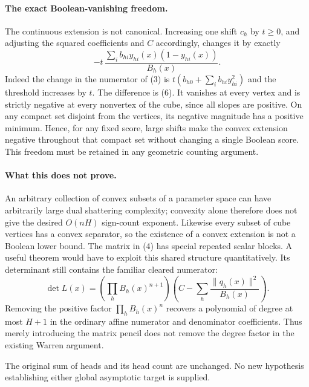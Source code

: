 \documentclass[11pt]{article}
\begin{document}
\paragraph{The exact Boolean-vanishing freedom.}
The continuous extension is not canonical. Increasing one shift $c_h$
by $t\geq0$, and adjusting the squared coefficients and $C$ accordingly,
changes it by exactly
\[
 -t\,\frac{\sum_i b_{hi}y_{hi}(x)(1-y_{hi}(x))}{B_h(x)}.
 \tag{6}
\]
Indeed the change in the numerator of (3) is
$t(b_{h0}+\sum_i b_{hi}y_{hi}^2)$ and the threshold increases by $t$.
The difference is (6). It vanishes at every vertex and is strictly
negative at every nonvertex of the cube, since all slopes are positive.
On any compact set disjoint from the vertices, its negative magnitude
has a positive minimum. Hence, for any fixed score, large shifts make
the convex extension negative throughout that compact set without
changing a single Boolean score. This freedom must be retained in any
geometric counting argument.

\paragraph{What this does not prove.}
An arbitrary collection of convex subsets of a parameter space can
have arbitrarily large dual shattering complexity; convexity alone
therefore does not give the desired $O(nH)$ sign-count exponent.
Likewise every subset of cube vertices has a convex separator, so the
existence of a convex extension is not a Boolean lower bound. The
matrix in (4) has special repeated scalar blocks. A useful theorem
would have to exploit this shared structure quantitatively.
Its determinant still contains the familiar cleared numerator:
\[
 \det L(x)=\left(\prod_h B_h(x)^{n+1}\right)
 \left(C-\sum_h\frac{\|q_h(x)\|^2}{B_h(x)}\right).
\]
Removing the positive factor $\prod_hB_h(x)^n$ recovers a polynomial
of degree at most $H+1$ in the ordinary affine numerator and denominator
coefficients. Thus merely introducing the matrix pencil does not remove
the degree factor in the existing Warren argument.

The original sum of heads and its head count are unchanged. No new
hypothesis establishing either global asymptotic target is supplied.
\end{document}
